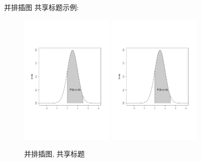 \documentclass{cosart}
\begin{document}
并排插图 共享标题示例:
\begin{figure}[htbp]
\centering
\includegraphics[width=0.40\textwidth]{figure.pdf}
\includegraphics[width=0.40\textwidth]{figure.pdf}
\caption{并排插图, 共享标题}
\end{figure}
\end{document}
